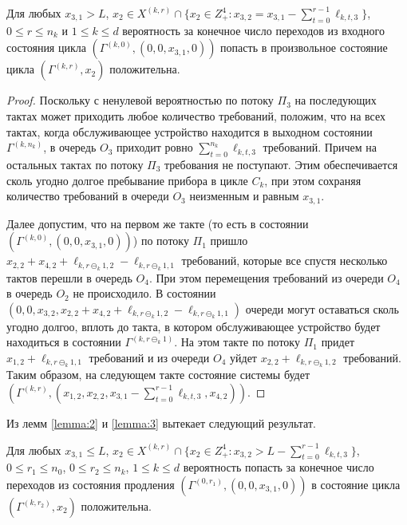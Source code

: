 \documentclass[a4paper,12pt,russian]{extarticle}
\newcommand{\ga}[1]{\Gamma^{\left( #1 \right)} }
\begin{document}
\begin{lemma}
Для любых $x_{3,1} > L$, $x_2 \in X^{(k,r)} \cap \{x_2\in Z_+^4 \colon x_{3,2} = x_{3,1} - \sum_{t=0}^{r-1}\ell_{k,t,3}\}$, $0 \leqslant r \leqslant n_k$ и $1 \leqslant k \leqslant d$  
вероятность за конечное число переходов из входного состояния цикла $(\ga{k,0}, (0,0,x_{3,1},0))$ попасть в произвольное состояние цикла $(\ga{k,r},x_2)$ положительна.
\label{lemma:3}
\end{lemma}
\begin{proof}
Поскольку с ненулевой вероятностью по потоку $\Pi_3$ на последующих тактах может приходить любое количество требований, положим, что на всех тактах, когда обслуживающее устройство находится в выходном состоянии $\ga{k,n_k}$, в очередь $O_3$ приходит ровно $\sum_{t=0}^{n_k} \ell_{k,t,3}$ требований. Причем на остальных тактах по потоку $\Pi_3$ требования не поступают. Этим обеспечивается сколь угодно долгое пребывание прибора в цикле $C_k$, при этом сохраняя количество требований в очереди $O_3$ неизменным и равным $x_{3,1}$.

Далее допустим, что на первом же такте (то есть в состоянии $(\ga{k,0}, (0,0,x_{3,1},0))$) по потоку $\Pi_1$ пришло $x_{2,2}+x_{4,2} + \ell_{k,r\ominus_k 1,2} - \ell_{k,r\ominus_k 1,1}$ требований, которые все спустя несколько тактов перешли в очередь $O_4$. При этом перемещения требований из очереди $O_4$ в очередь $O_2$ не происходило. В состоянии $(0, 0, x_{3,2}, x_{2,2}+x_{4,2} + \ell_{k,r\ominus_k 1,2} - \ell_{k,r\ominus_k 1,1})$ очереди могут оставаться сколь угодно долгоо, вплоть до такта, в котором обслуживающее устройство  будет находиться в состоянии $\ga{k,r\ominus_k 1}$. На этом такте по потоку $\Pi_1$ придет $x_{1,2}+\ell_{k,r\ominus_k 1,1}$ требований и из очереди $O_4$ уйдет $x_{2,2}+\ell_{k,r\ominus_k 1,2}$ требований. Таким образом, на следующем такте состояние системы будет $(\ga{k,r},(x_{1,2},x_{2,2},x_{3,1}-\sum_{t=0}^{r-1}\ell_{k,t,3},x_{4,2}))$.
\end{proof}

Из лемм \ref{lemma:2} и \ref{lemma:3} вытекает следующий результат.
\begin{lemma}
Для любых $x_{3,1} \leqslant L$, $x_2 \in X^{(k,r)} \cap \{x_2\in Z_+^4 \colon x_{3,2} > L - \sum_{t=0}^{r-1}\ell_{k,t,3}\}$, $0 \leqslant r_1 \leqslant n_0$, $0 \leqslant r_2 \leqslant n_k$, $1 \leqslant k \leqslant d$ вероятность попасть за конечное число переходов из состояния продления $(\ga{0,r_1},(0,0,x_{3,1},0))$ в состояние цикла $(\ga{k,r_2},x_2)$ положительна.
\label{lemma:4}
\end{lemma}
\end{document}
